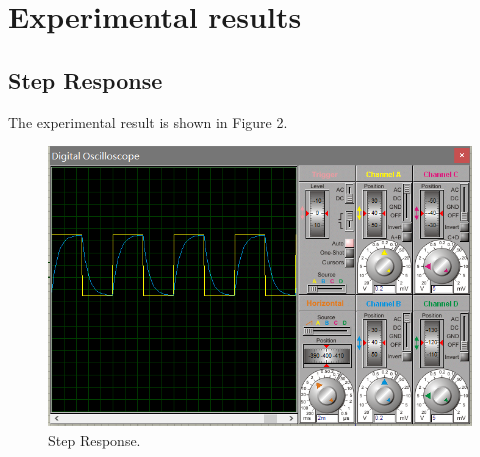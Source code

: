 \documentclass[a4paper]{article}
\begin{document}
\section{Experimental results}
\subsection{Step Response}
The experimental result is shown in Figure 2.
\begin{figure}[H]
	\centering
	\includegraphics[width=0.8\linewidth]{2.png}
	\caption{Step Response.}
\end{figure}
\end{document}
